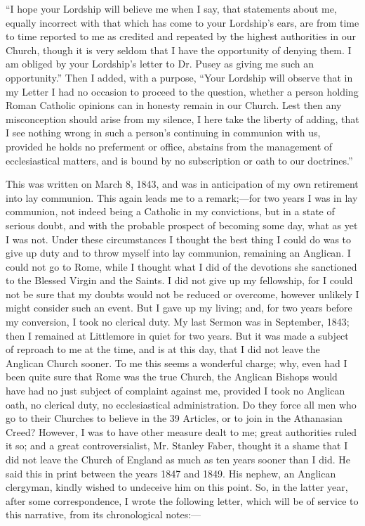 ``I hope your Lordship will believe me when I say, that
statements about me, equally incorrect with that which has come to your
Lordship's ears, are from time to time reported to me as credited
and repeated by the highest authorities in our Church, though it is very
seldom that I have the opportunity of denying them. I am obliged by your
Lordship's letter to Dr. Pusey as giving me such an opportunity.''
Then I added, with a purpose, ``Your Lordship will observe that in
my Letter I had no occasion to proceed to the question, whether a person
holding Roman Catholic opinions can in honesty remain in our Church.
Lest then any misconception should arise from my silence, I here take
the liberty of adding, that I see nothing wrong in such a person's
continuing in communion with us, provided he holds no preferment or
office, abstains from the management of ecclesiastical matters, and is
bound by no subscription or oath to our doctrines.''

This was written on March 8, 1843, and was in anticipation
of my own retirement into lay communion. This again leads me to a
remark;—for two years I was in lay communion, not indeed being a
Catholic in my convictions, but in a state of serious doubt, and with
the probable prospect of becoming some day, what as yet I was not. Under
these circumstances I thought the best thing I could do was to give up
duty and to throw myself into lay communion, remaining an Anglican. I
could not go to Rome, while I thought what I did of the devotions she
sanctioned to the Blessed Virgin and the Saints. I did not give up my
fellowship, for I could not be sure that my doubts would not be reduced
or overcome, however unlikely I might consider such an event. But I
gave up my living; and, for two years before my conversion, I took no
clerical duty. My last Sermon was in September, 1843; then I remained at
Littlemore in quiet for two years. But it was made a subject of reproach
to me at the time, and is at this day, that I did not leave the Anglican
Church sooner. To me this seems a wonderful charge; why, even had I
been quite sure that Rome was the true Church, the Anglican Bishops
would have had no just subject of complaint against me, provided I took
no Anglican oath, no clerical duty, no ecclesiastical administration. Do
they force all men who go to their Churches to believe in the 39
Articles, or to join in the Athanasian Creed? However, I was to
have other measure dealt to me; great authorities ruled it so; and a
great controversialist, Mr. Stanley Faber, thought it a shame that
I did not leave the Church of England as much as ten years sooner than I
did. He said this in print between the years 1847 and 1849. His
nephew, an Anglican clergyman, kindly wished to undeceive him on this
point. So, in the latter year, after some correspondence, I wrote the
following letter, which will be of service to this narrative, from its
chronological notes:—

